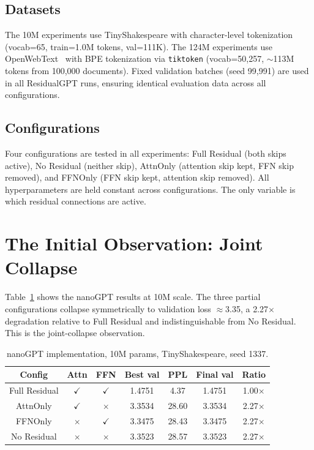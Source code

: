 \documentclass[11pt]{article}
\begin{document}
\subsection{Datasets}
The 10M experiments use TinyShakespeare with character-level tokenization (vocab=65, train=1.0M tokens, val=111K). The 124M experiments use OpenWebText~\cite{gokaslan2019openwebtext} with BPE tokenization via \texttt{tiktoken} (vocab=50,257, $\sim$113M tokens from 100,000 documents). Fixed validation batches (seed 99{,}991) are used in all ResidualGPT runs, ensuring identical evaluation data across all configurations.

\subsection{Configurations}
Four configurations are tested in all experiments: Full Residual (both skips active), No Residual (neither skip), AttnOnly (attention skip kept, FFN skip removed), and FFNOnly (FFN skip kept, attention skip removed). All hyperparameters are held constant across configurations. The only variable is which residual connections are active.

\section{The Initial Observation: Joint Collapse}
Table~\ref{tab:nanogpt10m} shows the nanoGPT results at 10M scale. The three partial configurations collapse symmetrically to validation loss $\approx$3.35, a 2.27$\times$ degradation relative to Full Residual and indistinguishable from No Residual. This is the joint-collapse observation.

\begin{table}[H]
\centering
\small
\caption{nanoGPT implementation, 10M params, TinyShakespeare, seed 1337.}
\label{tab:nanogpt10m}
\begin{tabular}{|c|c|c|c|c|c|c|}
\hline
\textbf{Config} & \textbf{Attn} & \textbf{FFN} & \textbf{Best val} & \textbf{PPL} & \textbf{Final val} & \textbf{Ratio} \\
\hline
Full Residual & $\checkmark$ & $\checkmark$ & 1.4751 & 4.37 & 1.4751 & 1.00$\times$ \\
\hline
AttnOnly & $\checkmark$ & $\times$ & 3.3534 & 28.60 & 3.3534 & 2.27$\times$ \\
\hline
FFNOnly & $\times$ & $\checkmark$ & 3.3475 & 28.43 & 3.3475 & 2.27$\times$ \\
\hline
No Residual & $\times$ & $\times$ & 3.3523 & 28.57 & 3.3523 & 2.27$\times$ \\
\hline
\end{tabular}
\end{table}
\end{document}
